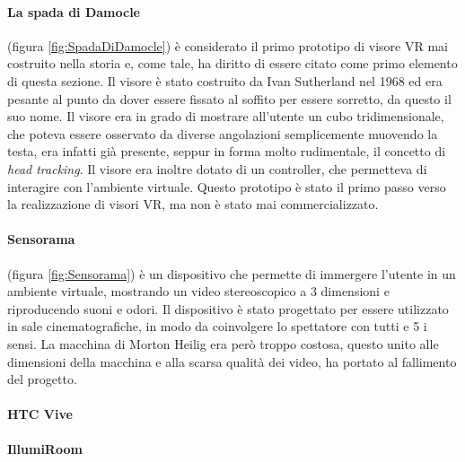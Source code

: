         \paragraph{La spada di Damocle} (figura \ref{fig:SpadaDiDamocle}) è considerato il primo prototipo di visore VR mai costruito nella storia e,
        come tale, ha diritto di essere citato come primo elemento di questa sezione. Il visore è stato costruito
        da Ivan Sutherland nel 1968 ed era pesante al punto da dover essere fissato al soffito per essere sorretto,
        da questo il suo nome. Il visore era in grado di mostrare all'utente un cubo tridimensionale, che poteva
        essere osservato da diverse angolazioni semplicemente muovendo la testa, era infatti già presente, seppur
        in forma molto rudimentale, il concetto di \textit{head tracking}. Il visore era inoltre dotato di un
        controller, che permetteva di interagire con l'ambiente virtuale. Questo prototipo è stato il primo passo
        verso la realizzazione di visori VR, ma non è stato mai commercializzato.

        \paragraph{Sensorama} (figura \ref{fig:Sensorama}) è un dispositivo che permette di immergere l'utente in un
        ambiente virtuale, mostrando un video stereoscopico a 3 dimensioni e riproducendo suoni e odori. Il dispositivo è stato
        progettato per essere utilizzato in sale cinematografiche, in modo da coinvolgere lo spettatore con tutti e 5 i sensi.
        La macchina di Morton Heilig era però troppo costosa, questo unito alle dimensioni della macchina e alla scarsa qualità
        dei video, ha portato al fallimento del progetto.


        \paragraph{HTC Vive}

        \paragraph{IllumiRoom}
        
